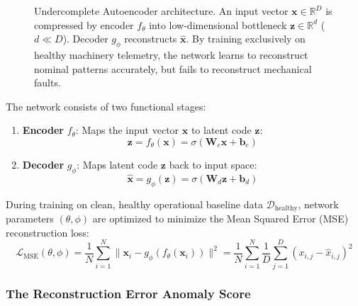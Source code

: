 \begin{figure}[htbp]
\caption{Undercomplete Autoencoder architecture. An input vector $\mathbf{x} \in \mathbb{R}^D$ is compressed by encoder $f_\theta$ into low-dimensional bottleneck $\mathbf{z} \in \mathbb{R}^d$ ($d \ll D$). Decoder $g_\phi$ reconstructs $\hat{\mathbf{x}}$. By training exclusively on healthy machinery telemetry, the network learns to reconstruct nominal patterns accurately, but fails to reconstruct mechanical faults.}\label{fig:autoencoder_arch}
\end{figure}

The network consists of two functional stages:
\begin{enumerate}
    \item \textbf{Encoder} $f_\theta$: Maps the input vector $\mathbf{x}$ to latent code $\mathbf{z}$:
    \begin{equation}
    \mathbf{z} = f_\theta(\mathbf{x}) = \sigma(\mathbf{W}_e \mathbf{x} + \mathbf{b}_e)\label{eq:encoder}
    \end{equation}
    \item \textbf{Decoder} $g_\phi$: Maps latent code $\mathbf{z}$ back to input space:
    \begin{equation}
    \hat{\mathbf{x}} = g_\phi(\mathbf{z}) = \sigma(\mathbf{W}_d \mathbf{z} + \mathbf{b}_d)\label{eq:decoder}
    \end{equation}
\end{enumerate}
During training on clean, healthy operational baseline data $\mathcal{D}_{\text{healthy}}$, network parameters $(\theta, \phi)$ are optimized to minimize the Mean Squared Error (MSE) reconstruction loss:
\begin{equation}
\mathcal{L}_{\text{MSE}}(\theta, \phi) = \frac{1}{N}\sum_{i=1}^N \|\mathbf{x}_i - g_\phi(f_\theta(\mathbf{x}_i))\|^2 = \frac{1}{N}\sum_{i=1}^N \frac{1}{D}\sum_{j=1}^D (x_{i,j} - \hat{x}_{i,j})^2\label{eq:autoencoder_loss}
\end{equation}

\subsubsection{The Reconstruction Error Anomaly Score}


